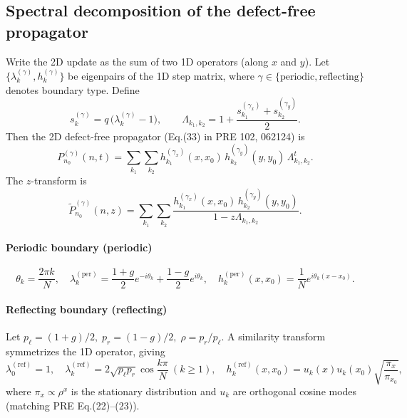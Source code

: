 \documentclass[11pt]{article}
\begin{document}
\subsection{Spectral decomposition of the defect-free propagator}
Write the 2D update as the sum of two 1D operators (along $x$ and $y$). Let $\{\lambda_k^{(\gamma)},h_k^{(\gamma)}\}$ be eigenpairs of the 1D step matrix, where $\gamma\in\{\text{periodic},\text{reflecting}\}$ denotes boundary type. Define
\begin{equation}
  s_k^{(\gamma)} = q\,\bigl(\lambda_k^{(\gamma)}-1\bigr),\qquad
  \Lambda_{k_1,k_2}=1+\frac{s_{k_1}^{(\gamma_x)}+s_{k_2}^{(\gamma_y)}}{2}.
\end{equation}
Then the 2D defect-free propagator (Eq.(33) in PRE 102, 062124) is
\begin{equation}
  P^{(\gamma)}_{n_0}(n,t)=\sum_{k_1}\sum_{k_2} h_{k_1}^{(\gamma_x)}(x,x_0)\,h_{k_2}^{(\gamma_y)}(y,y_0)\,\Lambda_{k_1,k_2}^t.
  \label{eq:P_time}
\end{equation}
The $z$-transform is
\begin{equation}
  \tilde P^{(\gamma)}_{n_0}(n,z)=\sum_{k_1}\sum_{k_2}
  \frac{h_{k_1}^{(\gamma_x)}(x,x_0)\,h_{k_2}^{(\gamma_y)}(y,y_0)}{1-z\Lambda_{k_1,k_2}}.
  \label{eq:P_z}
\end{equation}

\paragraph{Periodic boundary (periodic)} \;\;
\begin{equation}
  \theta_k=\frac{2\pi k}{N},\quad
  \lambda_k^{(\text{per})}=\frac{1+g}{2}e^{-i\theta_k}+\frac{1-g}{2}e^{i\theta_k},\quad
  h_k^{(\text{per})}(x,x_0)=\frac{1}{N}e^{i\theta_k(x-x_0)}.
\end{equation}

\paragraph{Reflecting boundary (reflecting)} \;\;
Let $p_\ell=(1+g)/2,\;p_r=(1-g)/2,\;\rho=p_r/p_\ell$. A similarity transform symmetrizes the 1D operator, giving
\begin{equation}
  \lambda_0^{(\text{ref})}=1,\quad
  \lambda_k^{(\text{ref})}=2\sqrt{p_\ell p_r}\cos\frac{k\pi}{N}\ (k\ge 1),\quad
  h_k^{(\text{ref})}(x,x_0)=u_k(x)u_k(x_0)\sqrt{\frac{\pi_x}{\pi_{x_0}}},
\end{equation}
where $\pi_x\propto \rho^x$ is the stationary distribution and $u_k$ are orthogonal cosine modes (matching PRE Eq.(22)--(23)).
\end{document}

